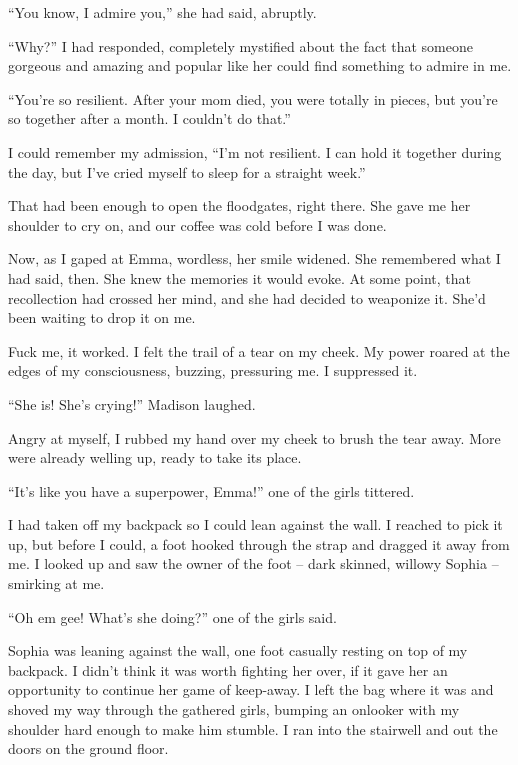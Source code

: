 ``You know, I admire you,'' she had said, abruptly.



``Why?'' I had responded, completely mystified about the fact that someone gorgeous and amazing and popular like her could find something to admire in me.



``You're so resilient.  After your mom died, you were totally in pieces, but you're so together after a month.  I couldn't do that.''



I could remember my admission, ``I'm not resilient.  I can hold it together during the day, but I've cried myself to sleep for a straight week.''



That had been enough to open the floodgates, right there.  She gave me her shoulder to cry on, and our coffee was cold before I was done.



Now, as I gaped at Emma, wordless, her smile widened.  She remembered what I had said, then.  She knew the memories it would evoke.  At some point, that recollection had crossed her mind, and she had decided to weaponize it.  She'd been waiting to drop it on me.



Fuck me, it worked.  I felt the trail of a tear on my cheek.  My power roared at the edges of my consciousness, buzzing, pressuring me.  I suppressed it.



``She is!  She's crying!''  Madison laughed.



Angry at myself, I rubbed my hand over my cheek to brush the tear away.  More were already welling up, ready to take its place.



``It's like you have a superpower, Emma!'' one of the girls tittered.



I had taken off my backpack so I could lean against the wall.  I reached to pick it up, but before I could, a foot hooked through the strap and dragged it away from me. I looked up and saw the owner of the foot – dark skinned, willowy Sophia – smirking at me.



``Oh em gee!  What's she doing?'' one of the girls said.



Sophia was leaning against the wall, one foot casually resting on top of my backpack.  I didn't think it was worth fighting her over, if it gave her an opportunity to continue her game of keep-away.  I left the bag where it was and shoved my way through the gathered girls, bumping an onlooker with my shoulder hard enough to make him stumble.  I ran into the stairwell and out the doors on the ground floor.



